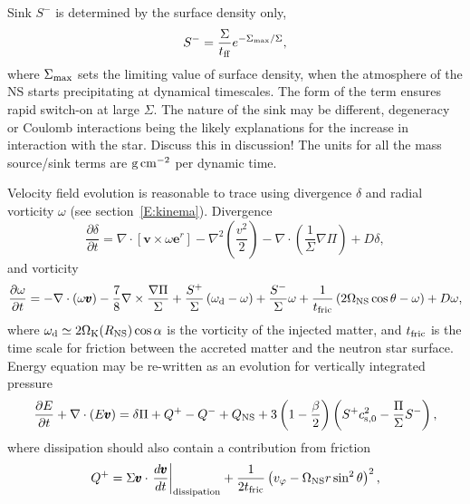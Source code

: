 \documentclass[usenatbib,onecolumn]{mnras}
\newcommand{\alert}[1]{\color{red} #1\color{black}}
\renewcommand{\vector}[1]{\ensuremath{\pmb{#1}}}
\newcommand{\pardir}[2]{\ensuremath{\frac{\partial #2}{\partial #1} }}
\begin{document}
Sink $S^-$ is determined by the surface density only,
\begin{equation}\label{E:set:sink}
  S^- = \frac{\Sigma}{t_{\rm ff}} e^{-\Sigma_{\rm max}/\Sigma},
\end{equation}
where $\Sigma_{\rm max}$ sets the limiting value of surface density, when the
atmosphere of the NS starts precipitating at dynamical timescales. The form of
the term ensures rapid switch-on at large $\Sigma$. The nature of the sink may
be different, degeneracy or Coulomb interactions being the likely explanations
for the increase in interaction with the star. \alert{ Discuss this in
  discussion!} The units for all the mass source/sink terms are ${\rm g \,
  cm^{-2}}$ per dynamic time.

Velocity field evolution is reasonable to trace using divergence $\delta$ and
radial vorticity $\omega$ (see section~\ref{E:kinema}). Divergence
\begin{equation}\label{E:set:div}
\pardir{t}{\delta} = \nabla \cdot [\vector{v} \times  \omega \vector{e}^r] -
\nabla^2 \left(\frac{v^2}{2}\right) - \nabla \cdot \left( \frac{1}{\Sigma}
\nabla \Pi \right)
+ D\delta,
\end{equation}
and vorticity
\begin{equation}\label{E:set:vort}
\pardir{t}{\omega} = -\nabla \cdot (\omega \vector{v}) -
\frac{7}{8}\nabla \times \frac{\nabla \Pi}{\Sigma}+
\frac{S^+}{\Sigma} \left(\omega_{\rm d}-\omega\right)+\frac{S^-}{\Sigma}\omega
+\frac{1}{t_{\rm fric}} \left( 2\Omega_{\rm NS} \cos\theta - \omega\right)
+ D\omega,
\end{equation}
where $\omega_{\rm d} \simeq 2\Omega_{\rm K}(R_{\rm NS})\cos \alpha$ is the
vorticity of the injected matter, and $t_{\rm fric}$ is the time scale for
friction between the accreted matter and the neutron star surface. 
Energy equation may be re-written as an evolution for vertically integrated
pressure
\begin{equation}\label{E:set:energy}
\pardir{t}{E} + \nabla \cdot \left( E \vector{v}\right) = \delta \Pi + Q^+ -
Q^- + Q_{\rm NS} + 3 \left(1-\frac{\beta}{2}\right) \left( S^+ c_{\rm s, 0}^2- \frac{\Pi}{\Sigma} S^-\right) 
,
\end{equation}
where dissipation should also contain a contribution from friction
\begin{equation}\label{E:set:qplus}
Q^+ = \Sigma \vector{v} \cdot \left.\frac{d\vector{v}}{dt}\right|_{\rm
  dissipation} + \frac{1}{2t_{\rm fric}}\left(v_\varphi-\Omega_{\rm NS}r\sin^2\theta\right)^2,
\end{equation}
\end{document}
